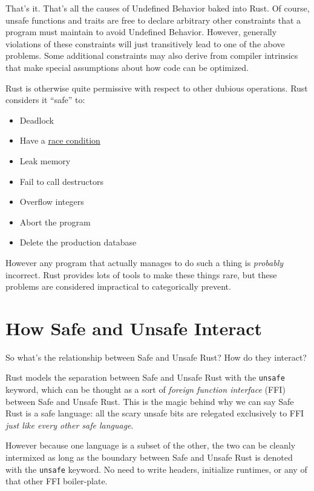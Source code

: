 \documentclass[a4paper,]{book}
\providecommand{\tightlist}{%
  \setlength{\itemsep}{0pt}\setlength{\parskip}{0pt}}
\begin{document}
That's it. That's all the causes of Undefined Behavior baked into Rust.
Of course, unsafe functions and traits are free to declare arbitrary
other constraints that a program must maintain to avoid Undefined
Behavior. However, generally violations of these constraints will just
transitively lead to one of the above problems. Some additional
constraints may also derive from compiler intrinsics that make special
assumptions about how code can be optimized.

Rust is otherwise quite permissive with respect to other dubious
operations. Rust considers it ``safe'' to:

\begin{itemize}
\tightlist
\item
  Deadlock
\item
  Have a \protect\hyperlink{sec--races}{race condition}
\item
  Leak memory
\item
  Fail to call destructors
\item
  Overflow integers
\item
  Abort the program
\item
  Delete the production database
\end{itemize}

However any program that actually manages to do such a thing is
\emph{probably} incorrect. Rust provides lots of tools to make these
things rare, but these problems are considered impractical to
categorically prevent.

\section{How Safe and Unsafe Interact}\label{sec--safe-unsafe-meaning}

So what's the relationship between Safe and Unsafe Rust? How do they
interact?

Rust models the separation between Safe and Unsafe Rust with the
\texttt{unsafe} keyword, which can be thought as a sort of \emph{foreign
function interface} (FFI) between Safe and Unsafe Rust. This is the
magic behind why we can say Safe Rust is a safe language: all the scary
unsafe bits are relegated exclusively to FFI \emph{just like every other
safe language}.

However because one language is a subset of the other, the two can be
cleanly intermixed as long as the boundary between Safe and Unsafe Rust
is denoted with the \texttt{unsafe} keyword. No need to write headers,
initialize runtimes, or any of that other FFI boiler-plate.
\end{document}
